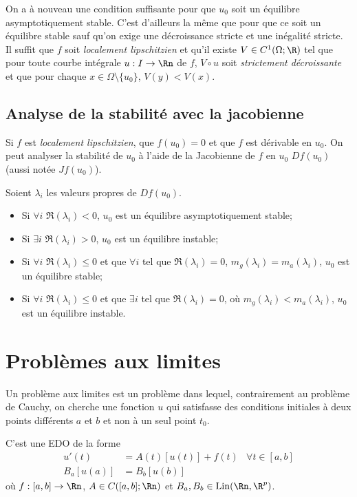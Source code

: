 On a à nouveau une condition suffisante
pour que $u_0$ soit un équilibre asymptotiquement stable.
C'est d'ailleurs la même que pour que ce soit un équilibre stable
sauf qu'on exige une décroissance stricte et une inégalité stricte.
Il suffit que $f$ soit \emph{localement lipschitzien} et qu'il existe
$V \in C^1(\Omega;\R)$ tel que pour toute courbe intégrale $u:I\to\Rn$ de $f$,
$V \circ u$ soit \emph{strictement décroissante} et
que pour chaque $x\in\Omega\setminus\{u_0\}$,
$V(y) < V(x)$.

\subsection{Analyse de la stabilité avec la jacobienne}
Si $f$ est \emph{localement lipschitzien},
que $f(u_0) = 0$ et que $f$ est dérivable
en $u_0$.
On peut analyser la stabilité de $u_0$ à l'aide de la Jacobienne de $f$
en $u_0$ $Df(u_0)$ (aussi notée $Jf(u_0)$).

Soient $\lambda_i$ les valeurs propres de $Df(u_0)$.
\begin{itemize}
  \item Si $\forall i$ $\Re(\lambda_i) < 0$, $u_0$
    est un équilibre asymptotiquement stable;
  \item Si $\exists i$ $\Re(\lambda_i) > 0$, $u_0$
    est un équilibre instable;
  \item Si $\forall i$ $\Re(\lambda_i) \leq 0$ et que $\forall i$ tel que
    $\Re(\lambda_i) = 0$, $m_g(\lambda_i) = m_a(\lambda_i)$,
    $u_0$ est un équilibre stable;
  \item Si $\forall i$ $\Re(\lambda_i) \leq 0$ et que $\exists i$ tel que
    $\Re(\lambda_i) = 0$, où $m_g(\lambda_i) < m_a(\lambda_i)$,
    $u_0$ est un équilibre instable.
\end{itemize}

\section{Problèmes aux limites}
Un problème aux limites est un problème dans lequel,
contrairement au problème de Cauchy,
on cherche une fonction $u$ qui satisfasse des conditions initiales
à deux points différents $a$ et $b$ et non à un seul point $t_0$.

C'est une EDO de la forme
\begin{align*}
  u'(t) & = A(t)[u(t)] + f(t) & \forall t \in [a,b]\\
  B_a[u(a)] & = B_b[u(b)]
\end{align*}
où $f:[a,b]\to\Rn$, $A \in C([a,b];\Rn)$ et $B_a,B_b \in \lin(\Rn,\R^p)$.


